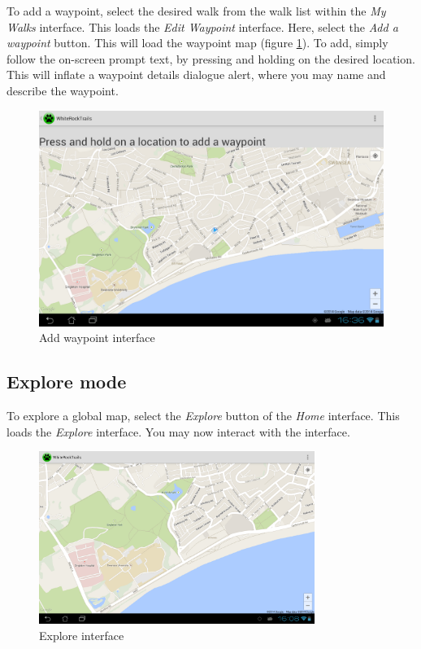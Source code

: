 \documentclass[11pt,a4paper]{report}
\begin{document}
To add a waypoint, select the desired walk from the walk list within the \emph{My Walks} interface. This loads the \emph{Edit Waypoint} interface. Here, select the \emph{Add a waypoint} button. This will load the waypoint map (figure \ref{fig:add_wayp}). To add, simply follow the on-screen prompt text, by pressing and holding on the desired location. This will inflate a waypoint details dialogue alert, where you may name and describe the waypoint.

\begin{figure}[H]
\centering
\includegraphics[width=0.8\linewidth]{./img/chris/add_waypoint}
\caption{Add waypoint interface}
\label{fig:add_wayp}
\end{figure}

\subsection{Explore mode}
\label{explore_mode}

To explore a global map, select the \emph{Explore} button of the \emph{Home} interface. This loads the \emph{Explore} interface. You may now interact with the interface.

\begin{figure}[H]
    \centering
    \includegraphics[width=0.8\textwidth]{chris/explore}
    \caption{Explore interface}
    \label{fig:expore_um}
\end{figure}
\end{document}

